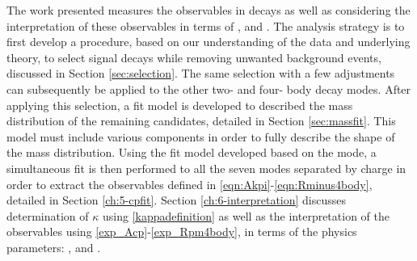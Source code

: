 The work presented measures the \CP observables in \decay{\Bm}{\D\Kstarm} decays as well as considering the interpretation of these observables in terms of \rb, \deltab and \Pgamma. The analysis strategy is to first develop a procedure, based on our understanding of the data and underlying theory, to select \decay{\Bm}{\D(\Km\pip)\Kstarm} signal decays while removing unwanted background events, discussed in Section \ref{sec:selection}. The same selection with a few adjustments can subsequently be applied to the other two- and four- body \D decay modes. After applying this selection, a fit model is developed to described the \B mass distribution of the remaining \decay{\Bm}{\D(\Km\pip)\Kstarm} candidates, detailed in Section \ref{sec:massfit}. This model must include various components in order to fully describe the shape of the \B mass distribution. Using the fit model developed based on the \decay{\Bm}{\D(\Km\pip)\Kstarm} mode, a simultaneous fit is then performed to all the seven \D modes separated by \B charge in order to extract the \CP observables defined in \eqn\ref{eqn:Akpi}-\ref{eqn:Rminus4body}, detailed in Section \ref{ch:5-cpfit}. Section \ref{ch:6-interpretation} discusses determination of $\kappa$ using \eqn\ref{kappadefinition} as well as the interpretation of the \CP observables using \eqn\ref{exp_Acp}-\ref{exp_Rpm4body}, in terms of the physics parameters: \rb, \deltab and \Pgamma.